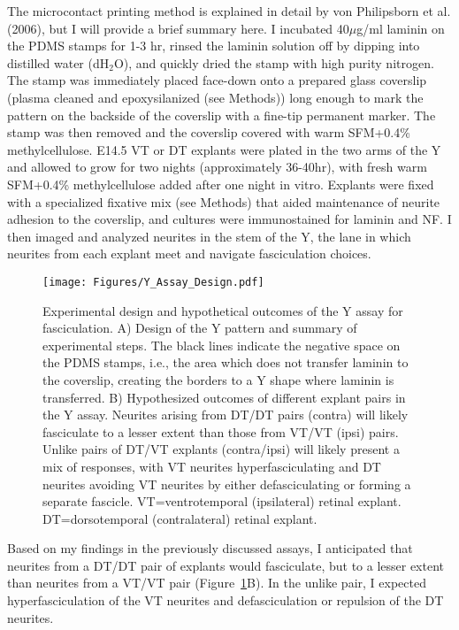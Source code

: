 The microcontact printing method is explained in detail by von Philipsborn et al. (2006), but I will provide a brief summary here.
I incubated 40$\mu$g/ml laminin on the PDMS stamps for 1-3 hr, rinsed the laminin solution off by dipping into distilled water (dH$_2$O), and quickly dried the stamp with high purity nitrogen.
The stamp was immediately placed face-down onto a prepared glass coverslip (plasma cleaned and epoxysilanized (see Methods)) long enough to mark the pattern on the backside of the coverslip with a fine-tip permanent marker.
The stamp was then removed and the coverslip covered with warm SFM+0.4\% methylcellulose.
E14.5 VT or DT explants were plated in the two arms of the Y and allowed to grow for two nights (approximately 36-40hr), with fresh warm SFM+0.4\% methylcellulose added after one night in vitro.
Explants were fixed with a specialized fixative mix (see Methods) that aided maintenance of neurite adhesion to the coverslip, and cultures were immunostained for laminin and NF.
I then imaged and analyzed neurites in the stem of the Y, the lane in which neurites from each explant meet and navigate fasciculation choices.
\begin{figure}[hbtp]
    \begin{center}
        \texttt{[image: Figures/Y\_Assay\_Design.pdf]}
        \caption[Experimental design and hypothetical outcomes of the Y assay for fasciculation.]
        {Experimental design and hypothetical outcomes of the Y assay for fasciculation.
        A) Design of the Y pattern and summary of experimental steps.
        The black lines indicate the negative space on the PDMS stamps, i.e., the area which does not transfer laminin to the coverslip, creating the borders to a Y shape where laminin is transferred.
        B) Hypothesized outcomes of different explant pairs in the Y assay.
        Neurites arising from DT/DT pairs (contra) will likely fasciculate to a lesser extent than those from VT/VT (ipsi) pairs.
        Unlike pairs of DT/VT explants (contra/ipsi) will likely present a mix of responses, with VT neurites hyperfasciculating and DT neurites avoiding VT neurites by either defasciculating or forming a separate fascicle.
        VT=ventrotemporal (ipsilateral) retinal explant.
        DT=dorsotemporal (contralateral) retinal explant.
        }
        \label{Figures/YAssayDesign}
    \end{center}
\end{figure}
Based on my findings in the previously discussed assays, I anticipated that neurites from a DT/DT pair of explants would fasciculate, but to a lesser extent than neurites from a VT/VT pair (Figure~\ref{Figures/YAssayDesign}B).
In the unlike pair, I expected hyperfasciculation of the VT neurites and defasciculation or repulsion of the DT neurites.

